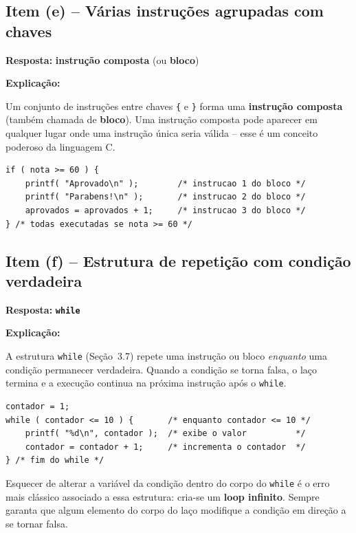 \documentclass[12pt,a4paper]{article}
\begin{document}
\subsection*{Item (e) -- Várias instruções agrupadas com chaves}

\begin{respostabox}
\textbf{Resposta:} \textcolor{deitelblue}{\textbf{instrução composta}} (ou \textbf{bloco})

\medskip\textbf{Explicação:}

Um conjunto de instruções entre chaves \texttt{\{} e \texttt{\}} forma uma
\textbf{instrução composta} (também chamada de \textbf{bloco}). Uma instrução composta
pode aparecer em qualquer lugar onde uma instrução única seria válida -- esse é
um conceito poderoso da linguagem C.

\begin{lstlisting}
if ( nota >= 60 ) {
    printf( "Aprovado\n" );        /* instrucao 1 do bloco */
    printf( "Parabens!\n" );       /* instrucao 2 do bloco */
    aprovados = aprovados + 1;     /* instrucao 3 do bloco */
} /* todas executadas se nota >= 60 */
\end{lstlisting}
\end{respostabox}

\subsection*{Item (f) -- Estrutura de repetição com condição verdadeira}

\begin{respostabox}
\textbf{Resposta:} \textcolor{deitelblue}{\textbf{\texttt{while}}}

\medskip\textbf{Explicação:}

A estrutura \texttt{while} (Seção~3.7) repete uma instrução ou bloco
\textit{enquanto} uma condição permanecer verdadeira. Quando a condição se torna
falsa, o laço termina e a execução continua na próxima instrução após o
\texttt{while}.

\begin{lstlisting}
contador = 1;
while ( contador <= 10 ) {       /* enquanto contador <= 10 */
    printf( "%d\n", contador );  /* exibe o valor          */
    contador = contador + 1;     /* incrementa o contador  */
} /* fim do while */
\end{lstlisting}

\begin{erroco}
  Esquecer de alterar a variável da condição dentro do corpo do \texttt{while}
  é o erro mais clássico associado a essa estrutura: cria-se um \textbf{loop
  infinito}. Sempre garanta que algum elemento do corpo do laço modifique a
  condição em direção a se tornar falsa.
\end{erroco}
\end{respostabox}
\end{document}
